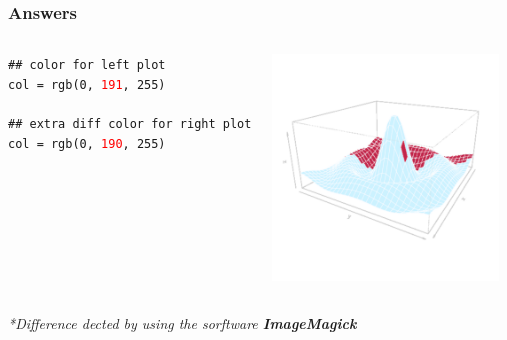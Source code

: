 \documentclass{beamer}
\begin{document}

\begin{frame}[fragile]
\frametitle{Answers}

\begin{columns}

\texttt{\textcolor{codegreen}{\#\# color for left plot}}\\
\texttt{col = rgb(0, \textcolor{red}{191}, 255)} \\~\\

\texttt{\textcolor{codegreen}{\#\# extra diff color for right plot}}\\
\texttt{col = rgb(0, \textcolor{red}{190}, 255)}


\begin{center}
\includegraphics[height = 6cm, width = 6cm]{plot/persp_diff_3.pdf}
\end{center}

\end{columns}

\hfill \textit{*Difference dected by using the sorftware \textbf{ImageMagick}}

\end{frame}



\end{document}
